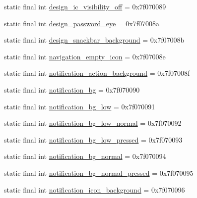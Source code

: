 \begin{DoxyCompactItemize}
\item 
static final int \mbox{\hyperlink{classandroid_1_1support_1_1design_1_1R_1_1drawable_a131e16776a80b5ad521533f34a9a7a19}{design\+\_\+ic\+\_\+visibility\+\_\+off}} = 0x7f070089
\item 
static final int \mbox{\hyperlink{classandroid_1_1support_1_1design_1_1R_1_1drawable_a43243cac50e3a6a26b7d8c777d1f821f}{design\+\_\+password\+\_\+eye}} = 0x7f07008a
\item 
static final int \mbox{\hyperlink{classandroid_1_1support_1_1design_1_1R_1_1drawable_a814061df3be11306bb3c0cddedfbcf5f}{design\+\_\+snackbar\+\_\+background}} = 0x7f07008b
\item 
static final int \mbox{\hyperlink{classandroid_1_1support_1_1design_1_1R_1_1drawable_a6f048ef7024f80d105eda85246d749f7}{navigation\+\_\+empty\+\_\+icon}} = 0x7f07008e
\item 
static final int \mbox{\hyperlink{classandroid_1_1support_1_1design_1_1R_1_1drawable_a61f589fa0fd573df67b2eb0d8e6c6655}{notification\+\_\+action\+\_\+background}} = 0x7f07008f
\item 
static final int \mbox{\hyperlink{classandroid_1_1support_1_1design_1_1R_1_1drawable_a0c2d9cb674ac7daf1163a496d9b96c61}{notification\+\_\+bg}} = 0x7f070090
\item 
static final int \mbox{\hyperlink{classandroid_1_1support_1_1design_1_1R_1_1drawable_afda479b62093e1d3f15c2acf374ab4ca}{notification\+\_\+bg\+\_\+low}} = 0x7f070091
\item 
static final int \mbox{\hyperlink{classandroid_1_1support_1_1design_1_1R_1_1drawable_a7c9ae1f5f999c9d50ef1cffb3376eac8}{notification\+\_\+bg\+\_\+low\+\_\+normal}} = 0x7f070092
\item 
static final int \mbox{\hyperlink{classandroid_1_1support_1_1design_1_1R_1_1drawable_a998d0007d33ed671c2a54687b465bb74}{notification\+\_\+bg\+\_\+low\+\_\+pressed}} = 0x7f070093
\item 
static final int \mbox{\hyperlink{classandroid_1_1support_1_1design_1_1R_1_1drawable_a082976ea2611d5e4b06b6bd5bbe33a80}{notification\+\_\+bg\+\_\+normal}} = 0x7f070094
\item 
static final int \mbox{\hyperlink{classandroid_1_1support_1_1design_1_1R_1_1drawable_a2b66e6494bd4d535188d64efe5f0d250}{notification\+\_\+bg\+\_\+normal\+\_\+pressed}} = 0x7f070095
\item 
static final int \mbox{\hyperlink{classandroid_1_1support_1_1design_1_1R_1_1drawable_a1d77f438c8bcf02cda09af18290aabe5}{notification\+\_\+icon\+\_\+background}} = 0x7f070096

\end{DoxyCompactItemize}
